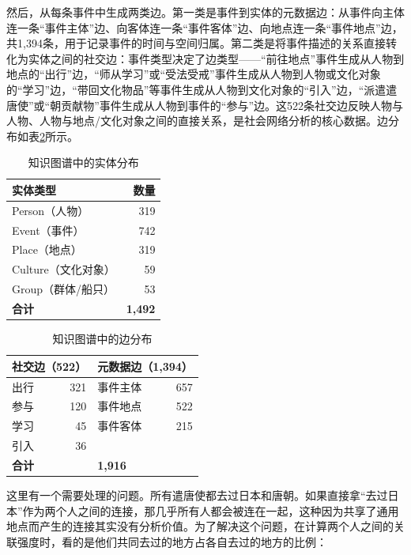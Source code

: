 \documentclass[12pt,a4paper]{article}
\begin{document}
然后，从每条事件中生成两类边。第一类是事件到实体的元数据边：从事件向主体连一条“事件主体”边、向客体连一条“事件客体”边、向地点连一条“事件地点”边，共1,394条，用于记录事件的时间与空间归属。第二类是将事件描述的关系直接转化为实体之间的社交边：事件类型决定了边类型——“前往地点”事件生成从人物到地点的“出行”边，“师从学习”或“受法受戒”事件生成从人物到人物或文化对象的“学习”边，“带回文化物品”等事件生成从人物到文化对象的“引入”边，“派遣遣唐使”或“朝贡献物”事件生成从人物到事件的“参与”边。这522条社交边反映人物与人物、人物与地点/文化对象之间的直接关系，是社会网络分析的核心数据。边分布如表\ref{tab:edges}所示。

\begin{table}[H]
\centering
\caption{知识图谱中的实体分布}
\label{tab:entities}
\begin{tabular}{lr}
\toprule
\textbf{实体类型} & \textbf{数量} \\
\midrule
Person（人物） & 319 \\
Event（事件） & 742 \\
Place（地点） & 319 \\
Culture（文化对象） & 59 \\
Group（群体/船只） & 53 \\
\midrule
\textbf{合计} & \textbf{1,492} \\
\bottomrule
\end{tabular}
\end{table}

\begin{table}[H]
\centering
\caption{知识图谱中的边分布}
\label{tab:edges}
\begin{tabular}{lrlr}
\toprule
\multicolumn{2}{c}{\textbf{社交边（522）}} & \multicolumn{2}{c}{\textbf{元数据边（1,394）}} \\
\midrule
出行 & 321 & 事件主体 & 657 \\
参与 & 120 & 事件地点 & 522 \\
学习 & 45 & 事件客体 & 215 \\
引入 & 36 & & \\
\midrule
\multicolumn{2}{l}{\textbf{合计}} & \multicolumn{2}{l}{\textbf{1,916}} \\
\bottomrule
\end{tabular}
\end{table}

这里有一个需要处理的问题。所有遣唐使都去过日本和唐朝。如果直接拿“去过日本”作为两个人之间的连接，那几乎所有人都会被连在一起，这种因为共享了通用地点而产生的连接其实没有分析价值。为了解决这个问题，在计算两个人之间的关联强度时，看的是他们共同去过的地方占各自去过的地方的比例：
\end{document}
